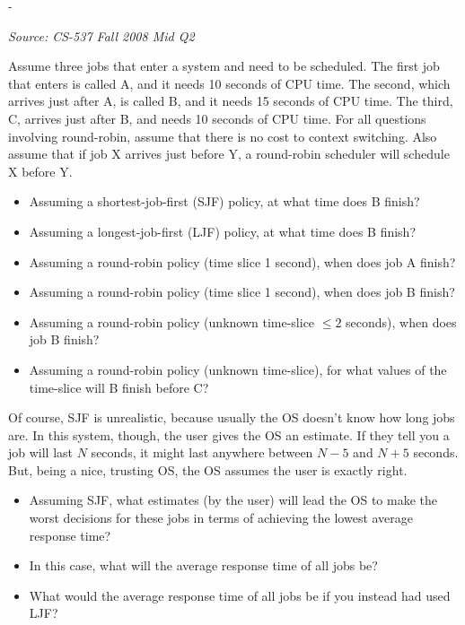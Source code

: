 \documentclass[11pt,a4paper]{article}
\makeatletter
\newcommand{\keepspace}[1]{\par\penalty-100\begingroup
  \setlength{\dimen@}{#1}\dimen@ii\pagegoal\advance\dimen@ii-\pagetotal
  \ifdim\dimen@>\dimen@ii\ifdim\dimen@ii>\z@\vfil\fi\break\fi\endgroup}
\newcounter{qn}[section]
\newenvironment{Qn}[4]{%
  \refstepcounter{qn}\keepspace{7\baselineskip}%
  \begin{tcolorbox}[qboxstyle, title={Q\thesection.\theqn\ \ [#1 \textbar\ #2]\ \ #4}]%
  {\footnotesize\color{g3}\textit{Source: #3}}\par\smallskip%
}{%
  \end{tcolorbox}%
}
\makeatother
\begin{document}
\begin{Qn}{Hard}{Lect 5--6}{CS-537 Fall 2008 Mid Q2}{RR finish times, and SJF with lying estimates}
Assume three jobs that enter a system and need to be scheduled. The first job that enters is called A, and it needs 10 seconds of CPU time. The second, which arrives just after A, is called B, and it needs 15 seconds of CPU time. The third, C, arrives just after B, and needs 10 seconds of CPU time.
For all questions involving round-robin, assume that there is no cost to context switching. Also assume that if job X arrives just before Y, a round-robin scheduler will schedule X before Y.
\begin{itemize}
  \item[(a)] Assuming a shortest-job-first (SJF) policy, at what time does B finish?
  \item[(b)] Assuming a longest-job-first (LJF) policy, at what time does B finish?
  \item[(c)] Assuming a round-robin policy (time slice 1 second), when does job A finish?
  \item[(d)] Assuming a round-robin policy (time slice 1 second), when does job B finish?
  \item[(e)] Assuming a round-robin policy (unknown time-slice $\le 2$ seconds), when does job B finish?
  \item[(f)] Assuming a round-robin policy (unknown time-slice), for what values of the time-slice will B finish before C?
\end{itemize}
Of course, SJF is unrealistic, because usually the OS doesn't know how long jobs are. In this system, though, the user gives the OS an estimate. If they tell you a job will last $N$ seconds, it might last anywhere between $N-5$ and $N+5$ seconds. But, being a nice, trusting OS, the OS assumes the user is exactly right.
\begin{itemize}
  \item[(g)] Assuming SJF, what estimates (by the user) will lead the OS to make the worst decisions for these jobs in terms of achieving the lowest average response time?
  \item[(h)] In this case, what will the average response time of all jobs be?
  \item[(i)] What would the average response time of all jobs be if you instead had used LJF?
\end{itemize}
\end{Qn}
\end{document}
